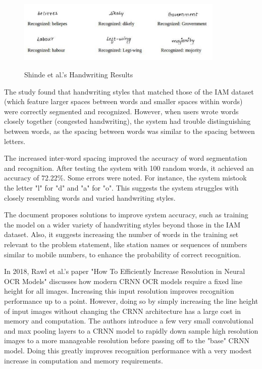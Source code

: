 \begin{figure}[ht]
    \centering
    \includegraphics[width=0.88\textwidth]{Figures/CRNN_Papers/Shinde_2020.jpg}
    \caption[Shinde et al.'s Handwriting Results]{Shinde et al.'s Handwriting Results}\cite{shindeUsingCRNNPerform2021}
    \label{fig:Shinde et al.'s Handwriting Results}
\end{figure}

The study found that handwriting styles that matched those of the IAM dataset (which feature larger spaces between words and smaller spaces within words) were correctly segmented and recognized. However, when users wrote words closely together (congested handwriting), the system had trouble distinguishing between words, as the spacing between words was similar to the spacing between letters.

The increased inter-word spacing improved the accuracy of word segmentation and recognition. After testing the system with 100 random words, it achieved an accuracy of 72.22\%. Some errors were noted. For instance, the system mistook the letter "l" for "d" and "a" for "o". This suggests the system struggles with closely resembling words and varied handwriting styles.

The document proposes solutions to improve system accuracy, such as training the model on a wider variety of handwriting styles beyond those in the IAM dataset. Also, it suggests increasing the number of words in the training set relevant to the problem statement, like station names or sequences of numbers similar to mobile numbers, to enhance the probability of correct recognition.\cite{shindeUsingCRNNPerform2021}


In 2018, Rawl et al.'s paper "How To Efficiently Increase Resolution in Neural OCR Models" discusses how modern CRNN OCR models require a fixed line height for all images. Increasing this input resolution improves recognition performance up to a point. However, doing so by simply increasing the line height of input images without changing the CRNN architecture has a large cost in memory and computation. The authors introduce a few very small convolutional and max pooling layers to a CRNN model to rapidly down sample high resolution images to a more manageable resolution before passing off to the "base" CRNN model. Doing this greatly improves recognition performance with a very modest increase in computation and memory requirements.

